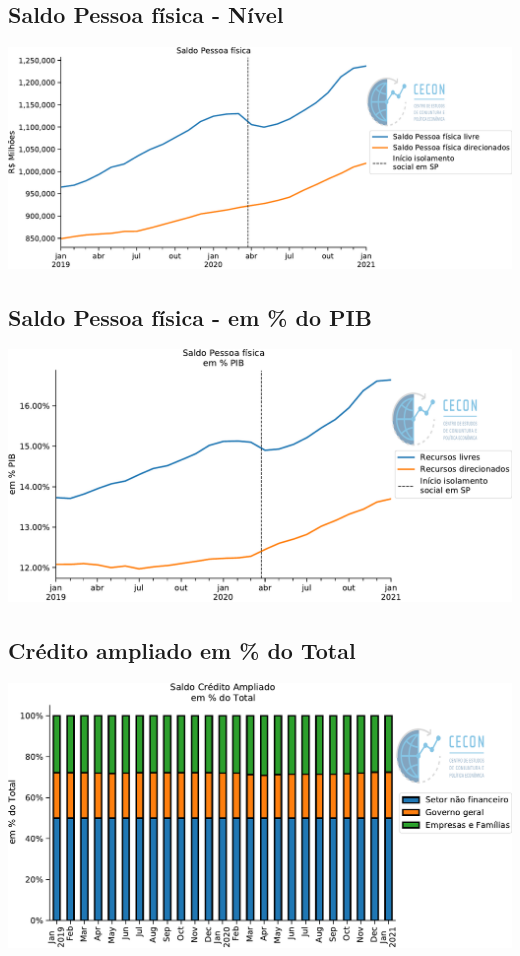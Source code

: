 \documentclass{SelfArx}
\begin{document}
\subsection*{Saldo Pessoa física - Nível}
\label{sec:orgd4e1103}

\begin{center}
\includegraphics[width=.9\linewidth]{./figs/Credito/SaldoPF.pdf}
\end{center}


\subsection*{Saldo Pessoa física - em \% do PIB}
\label{sec:org4a0a622}

\begin{center}
\includegraphics[width=.9\linewidth]{./figs/Credito/SaldoPF_PIB.pdf}
\end{center}


\subsection*{Crédito ampliado em \% do Total}
\label{sec:org27523b4}

\begin{center}
\includegraphics[width=.9\linewidth]{./figs/Credito/SaldoCreditoAmpliado_Total.pdf}
\end{center}
\end{document}
